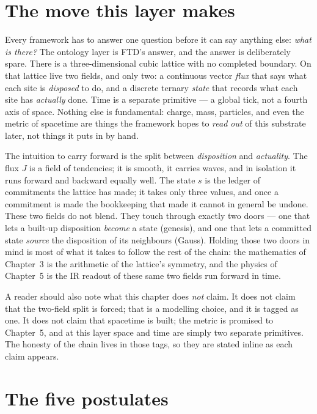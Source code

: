 \section*{The move this layer makes}

Every framework has to answer one question before it can say anything else:
\emph{what is there?} The ontology layer is FTD's answer, and the answer is
deliberately spare. There is a three-dimensional cubic lattice with no completed
boundary. On that lattice live two fields, and only two: a continuous vector
\emph{flux} that says what each site is \emph{disposed} to do, and a discrete
ternary \emph{state} that records what each site has \emph{actually} done. Time is
a separate primitive --- a global tick, not a fourth axis of space. Nothing else
is fundamental: charge, mass, particles, and even the metric of spacetime are
things the framework hopes to \emph{read out} of this substrate later, not things
it puts in by hand.

The intuition to carry forward is the split between \emph{disposition} and
\emph{actuality}. The flux $J$ is a field of tendencies; it is smooth, it carries
waves, and in isolation it runs forward and backward equally well. The state $s$
is the ledger of commitments the lattice has made; it takes only three values, and
once a commitment is made the bookkeeping that made it cannot in general be undone.
These two fields do not blend. They touch through exactly two doors --- one that
lets a built-up disposition \emph{become} a state (genesis), and one that lets a
committed state \emph{source} the disposition of its neighbours (Gauss). Holding
those two doors in mind is most of what it takes to follow the rest of the chain:
the mathematics of Chapter~3 is the arithmetic of the lattice's symmetry, and the
physics of Chapter~5 is the IR readout of these same two fields run forward in
time.

A reader should also note what this chapter does \emph{not} claim. It does not
claim that the two-field split is forced; that is a modelling choice, and it is
tagged as one. It does not claim that spacetime is built; the metric is promised
to Chapter~5, and at this layer space and time are simply two separate primitives.
The honesty of the chain lives in those tags, so they are stated inline as each
claim appears.

\section{The five postulates}\label{sec:postulates}

